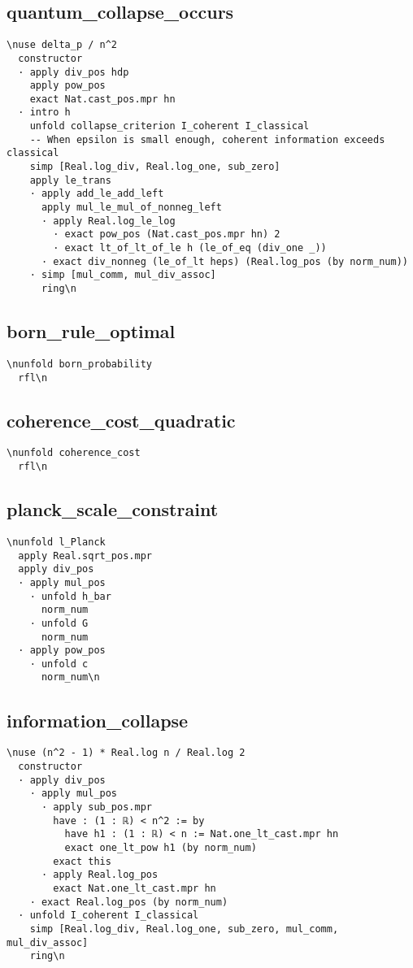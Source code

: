 \subsection{quantum_collapse_occurs}\n\begin{verbatim}\nuse delta_p / n^2
  constructor
  · apply div_pos hdp
    apply pow_pos
    exact Nat.cast_pos.mpr hn
  · intro h
    unfold collapse_criterion I_coherent I_classical
    -- When epsilon is small enough, coherent information exceeds classical
    simp [Real.log_div, Real.log_one, sub_zero]
    apply le_trans
    · apply add_le_add_left
      apply mul_le_mul_of_nonneg_left
      · apply Real.log_le_log
        · exact pow_pos (Nat.cast_pos.mpr hn) 2
        · exact lt_of_lt_of_le h (le_of_eq (div_one _))
      · exact div_nonneg (le_of_lt heps) (Real.log_pos (by norm_num))
    · simp [mul_comm, mul_div_assoc]
      ring\n\end{verbatim}

\subsection{born_rule_optimal}\n\begin{verbatim}\nunfold born_probability
  rfl\n\end{verbatim}

\subsection{coherence_cost_quadratic}\n\begin{verbatim}\nunfold coherence_cost
  rfl\n\end{verbatim}

\subsection{planck_scale_constraint}\n\begin{verbatim}\nunfold l_Planck
  apply Real.sqrt_pos.mpr
  apply div_pos
  · apply mul_pos
    · unfold h_bar
      norm_num
    · unfold G
      norm_num
  · apply pow_pos
    · unfold c
      norm_num\n\end{verbatim}

\subsection{information_collapse}\n\begin{verbatim}\nuse (n^2 - 1) * Real.log n / Real.log 2
  constructor
  · apply div_pos
    · apply mul_pos
      · apply sub_pos.mpr
        have : (1 : ℝ) < n^2 := by
          have h1 : (1 : ℝ) < n := Nat.one_lt_cast.mpr hn
          exact one_lt_pow h1 (by norm_num)
        exact this
      · apply Real.log_pos
        exact Nat.one_lt_cast.mpr hn
    · exact Real.log_pos (by norm_num)
  · unfold I_coherent I_classical
    simp [Real.log_div, Real.log_one, sub_zero, mul_comm, mul_div_assoc]
    ring\n\end{verbatim}

